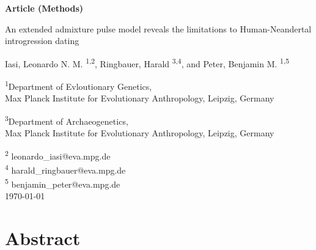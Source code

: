 \documentclass[11pt]{article}
\begin{document}
\begin{titlepage}

    \begin{flushright}
        \large
        \textbf{Article (Methods)}
    \end{flushright}


        \vspace*{1cm}
    \begin{center}       
        \Huge
        \vspace{1cm}
        An extended admixture pulse model reveals the limitations to Human-Neandertal introgression dating
        
        \vspace{1.0cm}
        \large
        Iasi, Leonardo N. M. \textsuperscript{1,2}, Ringbauer, Harald  \textsuperscript{3,4}, and Peter, Benjamin M. \textsuperscript{1,5} \\ 
        
        \vspace{1.0cm}
        
        \textsuperscript{1}Department of Evloutionary Genetics, \\ 
        Max Planck Institute for Evolutionary Anthropology, Leipzig, Germany
        
        \textsuperscript{3}Department of Archaeogenetics, \\ 
        Max Planck Institute for Evolutionary Anthropology, Leipzig, Germany
        
        \vspace{1.0cm}
        \textsuperscript{2} leonardo\_iasi@eva.mpg.de \\
        \textsuperscript{4} 
        harald\_ringbauer@eva.mpg.de \\\textsuperscript{5} 
        benjamin\_peter@eva.mpg.de \\
        \vspace{1.0cm}
        \today
    \end{center}  
     

            

\end{titlepage}


\section{Abstract}\label{sec:abstract}
\end{document}
